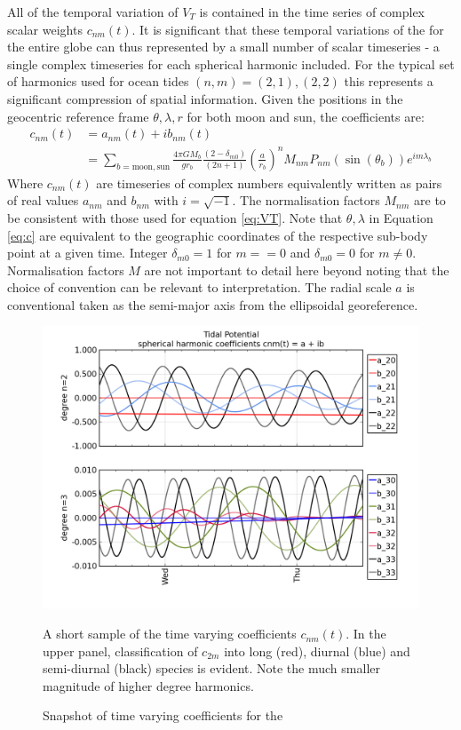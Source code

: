 All of the temporal variation of $V_T$ is contained in the time series of complex scalar weights $c_{nm}(t)$.
It is significant that these temporal variations of the \ATGP{} for the entire globe can thus represented by a small number of scalar timeseries - a single complex timeseries for each spherical harmonic included.  For the typical set of harmonics used for ocean tides $(n,m)=(2,1),(2,2)$ this represents a significant compression of spatial information.  
Given the positions in the geocentric reference frame $\theta,\lambda,r$ for both moon and sun, the coefficients are:
\begin{align}
\label{eq:c}
c_{nm}(t) &= a_{nm}(t) + ib_{nm}(t) \nonumber \\
          &= \sum_{b=\text{moon},\text{sun}}    \frac{4 \pi GM_{b}}{g r_{b}}  \frac{(2-\delta_{m0})} {(2n+1)} \left(\frac{a}{r_b} \right)^n    M_{nm} P_{nm}( \sin(\theta_b) ) e^{im\lambda_b}
\end{align}
Where $c_{nm}(t)$ are timeseries of complex numbers equivalently written as pairs of real values $a_{nm}$ and $b_{nm}$ with $i=\sqrt{-1}$.  The normalisation factors $M_{nm}$ are to be consistent with those used for equation \ref{eq:VT}.
Note that $\theta,\lambda$ in Equation \ref{eq:c} are equivalent to the geographic coordinates of the respective sub-body point at a given time. 
Integer $\delta_{m0} = 1$ for $m==0$ and $\delta_{m0} = 0$ for $m \neq 0$.\\
Normalisation factors $M$ are not important to detail here beyond noting that the choice of convention can be relevant to interpretation. The radial scale $a$ is conventional taken as the semi-major axis from the ellipsoidal georeference. 
\begin{figure}[!hbt] \centering
    \includegraphics[width=\figwidthBig]{figures/plots/tidal_coeff_timeseries_2days.png}
    \caption{Snapshot of time varying coefficients for the \ATGP{}}
{A short sample of the time varying coefficients $c_{nm}(t)$.  In the upper panel, classification of $c_{2m}$ into long (red), diurnal (blue) and semi-diurnal (black) species is evident.  Note the much smaller magnitude of higher degree harmonics.}
\end{figure}
